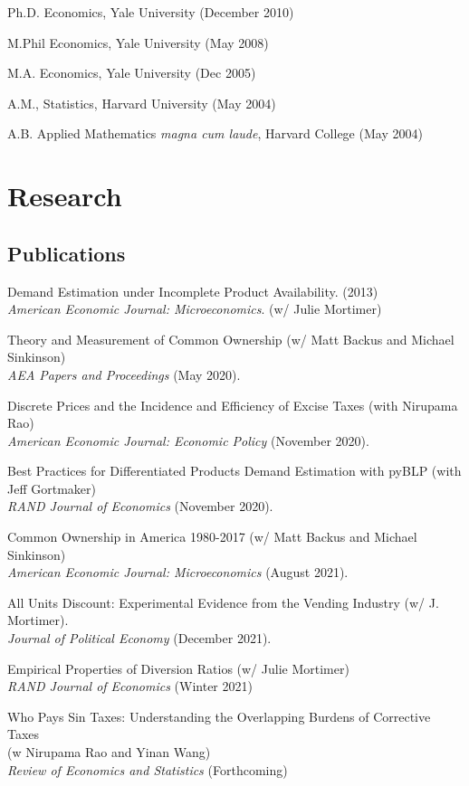 \documentclass[letterpaper]{article}
\renewenvironment{itemize}{
  \begin{list}{}{
    \setlength{\leftmargin}{1.5em}
  }
}{
  \end{list}
}
\begin{document}
\begin{itemize}
\item Ph.D. Economics, Yale University (December 2010)
\item M.Phil Economics, Yale University (May 2008)
\item M.A. Economics, Yale University (Dec 2005)
\item A.M., Statistics, Harvard University (May 2004)
\item A.B. Applied Mathematics \textit{magna cum laude}, Harvard College (May 2004)

\end{itemize}



\section*{Research}
\subsection*{Publications}
\begin{itemize}
\item Demand Estimation under Incomplete Product Availability. (2013)\\
 \textit{American Economic Journal: Microeconomics}. (w/ Julie Mortimer)
\item Theory and Measurement of Common Ownership (w/ Matt Backus and Michael Sinkinson) \\\textit{AEA Papers and Proceedings} (May 2020).
\item Discrete Prices and the Incidence and Efficiency of Excise Taxes  (with Nirupama Rao)  \\\textit{American Economic Journal: Economic Policy} (November 2020). 
\item Best Practices for Differentiated Products Demand Estimation with pyBLP (with Jeff Gortmaker) \\\textit{RAND Journal of Economics} (November 2020).
\item Common Ownership in America 1980-2017 (w/ Matt Backus and Michael Sinkinson) \\\textit{American Economic Journal: Microeconomics} (August 2021).
\item All Units Discount: Experimental Evidence from the Vending Industry (w/ J. Mortimer). \\\textit{Journal of Political Economy} (December 2021).
\item Empirical Properties of Diversion Ratios (w/ Julie Mortimer)\\\textit{RAND Journal of Economics} (Winter 2021)
\item Who Pays Sin Taxes: Understanding the Overlapping Burdens of Corrective Taxes\\
 (w Nirupama Rao and Yinan Wang) \\
 \textit{Review of Economics and Statistics} (Forthcoming)
\end{itemize}
\end{document}

